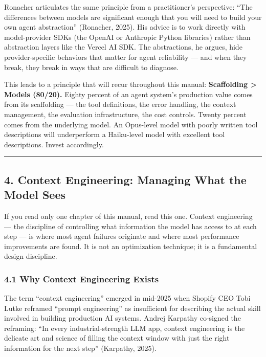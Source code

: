 \documentclass[11pt, a4paper]{article}
\begin{document}
Ronacher articulates the same principle from a practitioner's
perspective: ``The differences between models are significant enough
that you will need to build your own agent abstraction'' (Ronacher,
2025). His advice is to work directly with model-provider SDKs (the
OpenAI or Anthropic Python libraries) rather than abstraction layers
like the Vercel AI SDK. The abstractions, he argues, hide
provider-specific behaviors that matter for agent reliability --- and
when they break, they break in ways that are difficult to diagnose.

This leads to a principle that will recur throughout this manual:
\textbf{Scaffolding \textgreater{} Models (80/20).} Eighty percent of an
agent system's production value comes from its scaffolding --- the tool
definitions, the error handling, the context management, the evaluation
infrastructure, the cost controls. Twenty percent comes from the
underlying model. An Opus-level model with poorly written tool
descriptions will underperform a Haiku-level model with excellent tool
descriptions. Invest accordingly.

\begin{center}\rule{0.5\linewidth}{0.5pt}\end{center}

\hypertarget{context-engineering-managing-what-the-model-sees}{%
\subsection{4. Context Engineering: Managing What the Model
Sees}\label{context-engineering-managing-what-the-model-sees}}

If you read only one chapter of this manual, read this one. Context
engineering --- the discipline of controlling what information the model
has access to at each step --- is where most agent failures originate
and where most performance improvements are found. It is not an
optimization technique; it is a fundamental design discipline.

\hypertarget{why-context-engineering-exists}{%
\subsubsection{4.1 Why Context Engineering
Exists}\label{why-context-engineering-exists}}

The term ``context engineering'' emerged in mid-2025 when Shopify CEO
Tobi Lutke reframed ``prompt engineering'' as insufficient for
describing the actual skill involved in building production AI systems.
Andrej Karpathy co-signed the reframing: ``In every industrial-strength
LLM app, context engineering is the delicate art and science of filling
the context window with just the right information for the next step''
(Karpathy, 2025).
\end{document}
